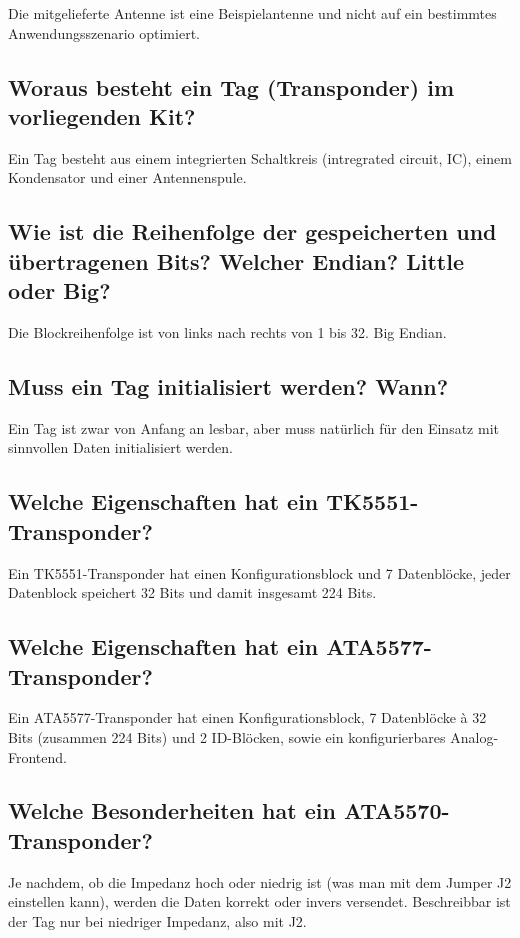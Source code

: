 \documentclass[paper=a4,fontsize=11pt,headsepline,footsepline,parskip=half]{scrartcl}
\begin{document}
Die mitgelieferte Antenne ist eine Beispielantenne und nicht auf ein bestimmtes
Anwendungsszenario optimiert.

\subsection{Woraus besteht ein Tag (Transponder) im vorliegenden Kit?}

Ein Tag besteht aus einem integrierten Schaltkreis (intregrated circuit, IC), einem Kondensator und einer Antennenspule.

\subsection{Wie ist die Reihenfolge der gespeicherten und übertragenen Bits? Welcher Endian? Little oder Big?}

Die Blockreihenfolge ist von links nach rechts von 1 bis 32. Big Endian.

\subsection{Muss ein Tag initialisiert werden? Wann?}

Ein Tag ist zwar von Anfang an lesbar, aber muss natürlich für den Einsatz mit
sinnvollen Daten initialisiert werden.

\subsection{Welche Eigenschaften hat ein TK5551-Transponder?}

Ein TK5551-Transponder hat einen Konfigurationsblock und 7 Datenblöcke, jeder Datenblock speichert 32 Bits und damit insgesamt 224 Bits.

\subsection{Welche Eigenschaften hat ein ATA5577-Transponder?}

Ein ATA5577-Transponder hat einen Konfigurationsblock, 7 Datenblöcke à 32 Bits (zusammen 224 Bits) und 2 ID-Blöcken, sowie ein konfigurierbares
Analog-Frontend.

\subsection{Welche Besonderheiten hat ein ATA5570-Transponder?}

Je nachdem, ob die Impedanz hoch oder niedrig ist (was man mit dem Jumper J2
einstellen kann), werden die Daten korrekt oder invers versendet. Beschreibbar
ist der Tag nur bei niedriger Impedanz, also mit J2.
\end{document}
